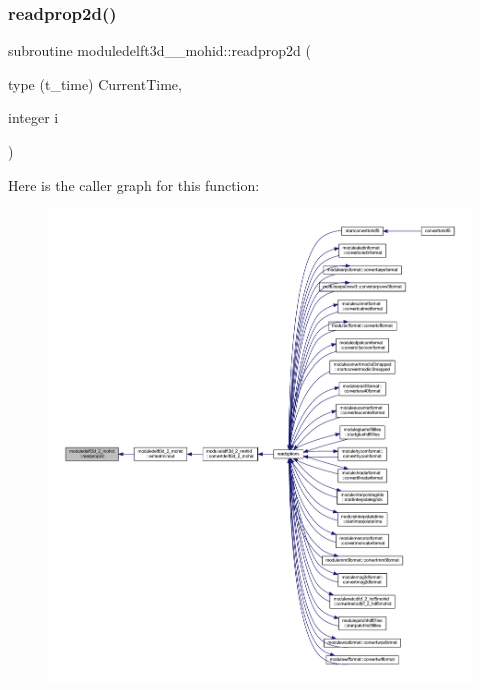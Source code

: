 \subsubsection{\texorpdfstring{readprop2d()}{readprop2d()}}
{\footnotesize\ttfamily subroutine moduledelft3d\+\_\+\_\+mohid\+::readprop2d (\begin{DoxyParamCaption}\item[{type (t\+\_\+time)}]{Current\+Time,  }\item[{integer}]{i }\end{DoxyParamCaption})\hspace{0.3cm}{\ttfamily [private]}}

Here is the caller graph for this function\+:\nopagebreak
\begin{figure}[H]
\begin{center}
\leavevmode
\includegraphics[width=350pt]{namespacemoduledelft3d__2__mohid_a34356a964207fa4a212d0973afb377b2_icgraph}
\end{center}
\end{figure}
\mbox{\label{namespacemoduledelft3d__2__mohid_a6327ce6561d3a18563b847433529a19d}} 
